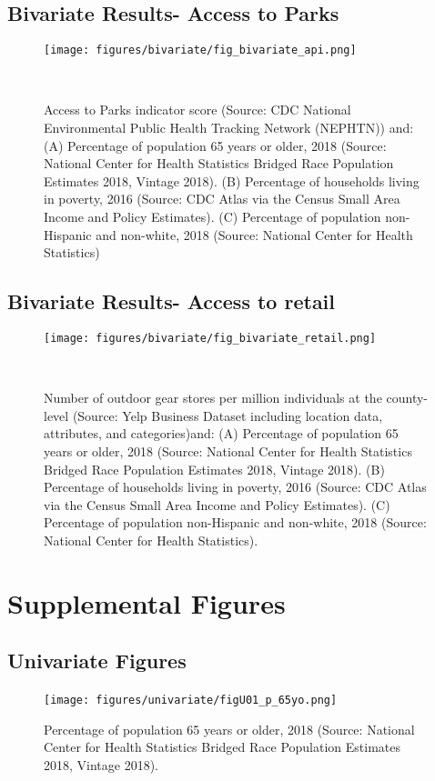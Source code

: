 \documentclass{article}
\begin{document}
\subsection{\textbf{Bivariate Results- Access to Parks}}
\begin{figure}[!h] 
    \centering
    \texttt{[image: figures/bivariate/fig\_bivariate\_api.png]}
    \caption{Access to Parks indicator score (Source: CDC National Environmental Public Health Tracking Network (NEPHTN)) and: (A) Percentage of population 65 years or older, 2018 (Source: National Center for Health Statistics Bridged Race Population Estimates 2018, Vintage 2018). (B) Percentage of households living in poverty, 2016 (Source: CDC Atlas via the Census Small Area Income and Policy Estimates). (C) Percentage of population non-Hispanic and non-white, 2018 (Source: National Center for Health Statistics)}
    \
\end{figure}
\FloatBarrier

\subsection{\textbf{Bivariate Results- Access to retail}}
\begin{figure}[!h] 
    \centering
    \texttt{[image: figures/bivariate/fig\_bivariate\_retail.png]}
    \caption{Number of outdoor gear stores per million individuals at the county-level (Source: Yelp Business Dataset including location data, attributes, and categories)and: (A) Percentage of population 65 years or older, 2018 (Source: National Center for Health Statistics Bridged Race Population Estimates 2018, Vintage 2018). (B) Percentage of households living in poverty, 2016 (Source: CDC Atlas via the Census Small Area Income and Policy Estimates). (C) Percentage of population non-Hispanic and non-white, 2018 (Source: National Center for Health Statistics).}
    \
\end{figure}
\FloatBarrier

\section{Supplemental Figures}
\subsection{\textbf{Univariate Figures}}
\begin{figure}[!h] 
    \centering
    \caption{Percentage of population 65 years or older, 2018 (Source: National Center for Health Statistics Bridged Race Population Estimates 2018, Vintage 2018).}
    \texttt{[image: figures/univariate/figU01\_p\_65yo.png]}
    \
\end{figure}
\FloatBarrier
\end{document}
